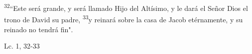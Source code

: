 \documentclass[../../rosario.tex]{subfiles}
\begin{document}
    \textsuperscript{32}``Este será grande, y será llamado Hijo del Altísimo, y le dará el Señor Dios el trono de David su padre, \textsuperscript{33}y reinará
    sobre la casa de Jacob etérnamente, y su reinado no tendrá fin".
    \begin{flushright}
    Lc. 1, 32-33
    \end{flushright}
\end{document}
